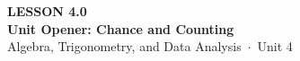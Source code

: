 \documentclass[aspectratio=169, 11pt]{beamer}
\begin{document}
{
\begin{frame}[plain]
  \vspace{2.8cm}\hspace{0.55cm}%
  \begin{minipage}{0.9\textwidth}
    {\color{goldacc}\bfseries\small LESSON 4.0}\\[0.5cm]
    {\color{white}\bfseries\LARGE Unit Opener: Chance and Counting}\\[1.2cm]
    {\color{mistmid}\small Algebra, Trigonometry, and Data Analysis~$\cdot$~Unit 4}
  \end{minipage}
\end{frame}
}

\begin{frame}[t, plain]
\end{frame}
\end{document}
